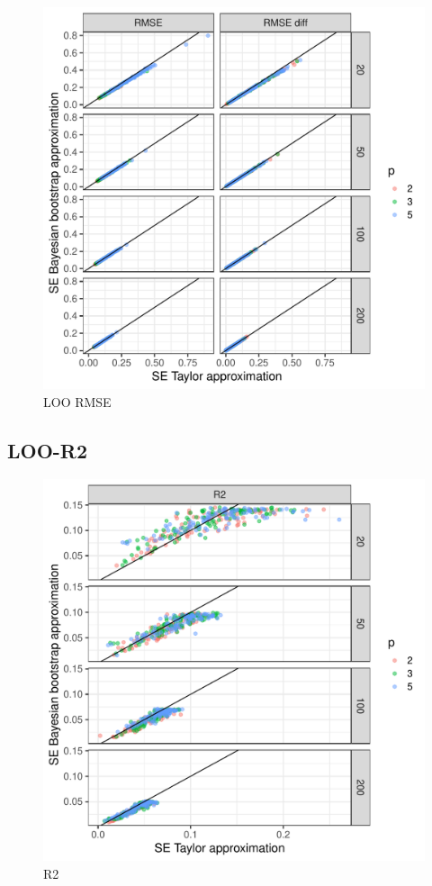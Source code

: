 \documentclass{article}
\begin{document}
\begin{figure}[!htb]
    \centering
    \includegraphics[width=\textwidth]{loo_rmse.pdf}
    \caption{LOO RMSE}
    \label{fig:loo-rmse-plot}
\end{figure}


\subsection{LOO-R2}

\begin{figure}[!htb]
    \centering
    \includegraphics[width=\textwidth]{r2.pdf}
    \caption{R2}
    \label{fig:r2-plot}
\end{figure}
\end{document}
